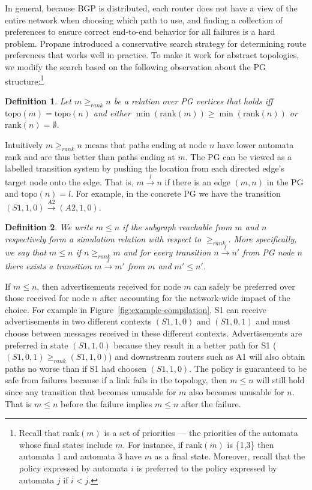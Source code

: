 \documentclass[numbers, 10pt, preprint]{sigplanconf}
\newcommand{\Propane}{{\text{}\small \sf Propane}\xspace}
\newcommand{\Topo}[1]{\ensuremath{{\mathrm{topo}}(#1)}}
\newcommand{\Pref}{\ensuremath{\mathrm{rank}}}
\newtheorem{defn}{Definition}[section]
\begin{document}
In general, because BGP is distributed, each router does not have a view of the entire network when choosing which path to use, and finding a collection of preferences to ensure correct end-to-end behavior for all failures is a hard problem. \Propane introduced a conservative search strategy for determining route preferences that works well in practice. To make it work for abstract topologies, we modify the search based on the following observation about the PG structure:\footnote{Recall that $\Pref(m)$ is a set of priorities --- the priorities of the
automata whose final states include $m$.  
For instance, if $\Pref(m)$ is \{1,3\} then
automata 1 and automata 3 have $m$ as a final state.  Moreover, recall that
the policy expressed by automata $i$ is preferred to the policy expressed
by automata $j$ if $i < j$.}

\begin{defn}
Let $m \geq_{rank} n$ be a relation over PG vertices that holds iff $\Topo{m} = \Topo{n}$ and either $\min (\Pref(m)) \geq \min (\Pref(n))$ or $\Pref(n) = \emptyset$.
%
\end{defn}
\noindent
%
Intuitively $m \geq_{rank} n$ means that paths ending at node $n$ have lower automata rank and are thus better than paths ending at $m$.
The PG can be viewed as a labelled transition system by pushing the location from each directed edge's target node onto the edge. That is, $m\overset{l}{\rightarrow}n$ if there is an edge $(m,n)$ in the PG and $\Topo{n} = l$.
%
For example, in the concrete PG we have the transition $(S1,1,0)\overset{A2}{\rightarrow}(A2,1,0)$.

\begin{defn}
We write $m \leq n$ if the subgraph reachable from $m$ and $n$ respectively form a simulation relation with respect to $\geq_{rank}$. More specifically, we say that $m \leq n$ if $n \geq_{rank} m$ and for every transition $n\overset{l}{\rightarrow}n'$ from PG node $n$ there exists a transition $m\overset{l}{\rightarrow}m'$ from $m$ and $m' \leq n'$.
\end{defn}


If $m \leq n$, then advertisements received for node $m$ can safely be preferred over those received for node $n$ after accounting for the network-wide impact of the choice. For example in Figure~\ref{fig:example-compilation}, S1 can receive advertisements in two different contexts $(S1,1,0)$ and $(S1,0,1)$ and must choose between messages received in these different contexts. Advertisements are preferred in state $(S1,1,0)$ because they result in a better path for S1 ($(S1,0,1) \geq_{rank} (S1,1,0)$) and downstream routers such as A1 will also obtain paths no worse than if S1 had choosen $(S1,1,0)$. The policy is guaranteed to be safe from failures because if a link fails in the topology, then $m \leq n$ will still hold since any transition that becomes unusable for $m$ also becomes unusable for $n$. That is $m \leq n$ before the failure implies $m \leq n$ after the failure.
\end{document}
